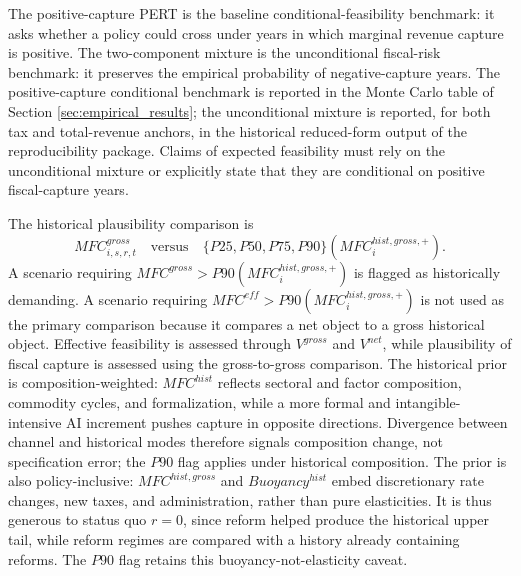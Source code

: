 \documentclass[11pt,a4paper]{article}
\begin{document}
The positive-capture PERT is the baseline conditional-feasibility benchmark: it asks whether a policy could cross under years in which marginal revenue capture is positive. The two-component mixture is the unconditional fiscal-risk benchmark: it preserves the empirical probability of negative-capture years. The positive-capture conditional benchmark is reported in the Monte Carlo table of Section \ref{sec:empirical_results}; the unconditional mixture is reported, for both tax and total-revenue anchors, in the historical reduced-form output of the reproducibility package. Claims of expected feasibility must rely on the unconditional mixture or explicitly state that they are conditional on positive fiscal-capture years.

The historical plausibility comparison is
\begin{equation}\label{eq:historical_comparison_v10}
    MFC^{gross}_{i,s,r,t}\quad \text{versus}\quad
    \{P25,P50,P75,P90\}(MFC^{hist,gross,+}_i).
\end{equation}
A scenario requiring $MFC^{gross}>P90(MFC^{hist,gross,+}_i)$ is flagged as historically demanding. A scenario requiring $MFC^{eff}>P90(MFC^{hist,gross,+}_i)$ is not used as the primary comparison because it compares a net object to a gross historical object. Effective feasibility is assessed through $V^{gross}$ and $V^{net}$, while plausibility of fiscal capture is assessed using the gross-to-gross comparison.
The historical prior is composition-weighted: $MFC^{hist}$ reflects sectoral and factor composition, commodity cycles, and formalization, while a more formal and intangible-intensive AI increment pushes capture in opposite directions. Divergence between channel and historical modes therefore signals composition change, not specification error; the $P90$ flag applies under historical composition. The prior is also policy-inclusive: $MFC^{hist,gross}$ and $Buoyancy^{hist}$ embed discretionary rate changes, new taxes, and administration, rather than pure elasticities. It is thus generous to status quo $r=0$, since reform helped produce the historical upper tail, while reform regimes are compared with a history already containing reforms. The $P90$ flag retains this buoyancy-not-elasticity caveat.
\end{document}
